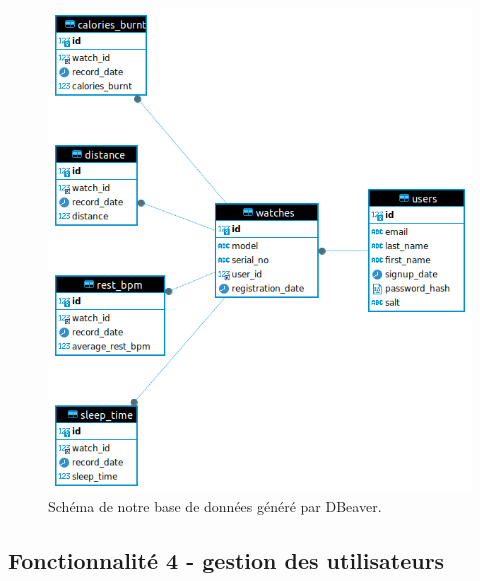 \documentclass[french]{article}
\begin{document}
    \begin{figure}[h!]
        \includegraphics[width=12cm]{bdd}
        \centering
        \caption{Schéma de notre base de données généré par DBeaver.}
        \centering
    \end{figure}
    
    \subsection{Fonctionnalité 4 - gestion des utilisateurs}
\end{document}
